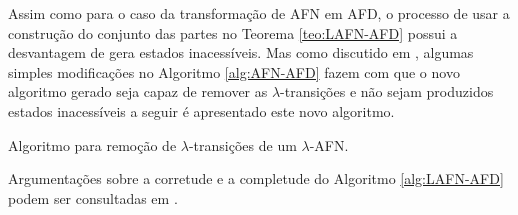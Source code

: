 Assim como para o caso da transformação de AFN em AFD, o processo de usar a construção do conjunto das partes no Teorema \ref{teo:LAFN-AFD} possui a desvantagem de gera estados inacessíveis. Mas como discutido em \cite{benja-2011, benja-2015, hopcroft2008, linz2006}, algumas simples modificações no Algoritmo \ref{alg:AFN-AFD} fazem com que o novo algoritmo gerado seja capaz de remover as $\lambda$-transições e não sejam produzidos estados inacessíveis a seguir é apresentado este novo algoritmo.

\begin{algorithm}[h]
	\caption{Algoritmo para remoção de $\lambda$-transições de um $\lambda$-AFN.}
	\label{alg:LAFN-AFD}
\end{algorithm}

\begin{rema}
	Argumentações sobre a corretude e a completude do Algoritmo \ref{alg:LAFN-AFD} podem ser consultadas em \cite{hopcroft2008}.
\end{rema}

